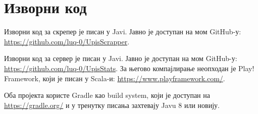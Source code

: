\chapter{Изворни код}\label{ch:V}

Изворни код за скрепер је писан у Javi. Јавно је доступан на мом GitHub-у: \url{https://github.com/luq-0/UpisScrapper}.

Изворни код за сервер је писан у Javi. Јавно је доступан на мом GitHub-у: \url{https://github.com/luq-0/UpisStats}. За његово компајлирање неопходан је Play! Framework, који је писан у Scala-и: \url{https://www.playframework.com/}.

Оба пројекта користе Gradle као build system, који је доступан на \url{https://gradle.org/} и у тренутку писања захтевају Javu 8 или новију. %